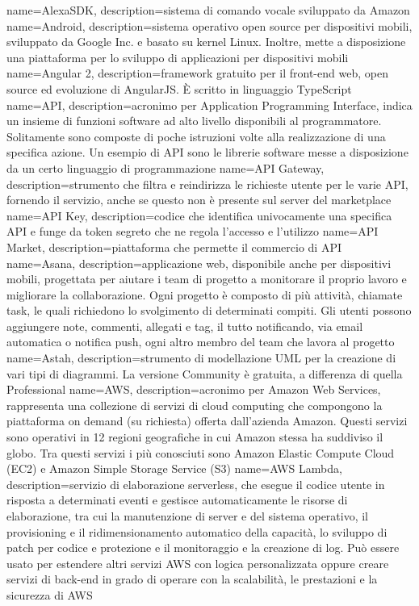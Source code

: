 \hypertarget{A}{}

{
	name=AlexaSDK,
	description={sistema di comando vocale sviluppato da Amazon}
}
{
	name=Android,
	description={sistema operativo open source per dispositivi mobili, sviluppato da Google Inc. e basato su kernel Linux. Inoltre, mette a disposizione una piattaforma per lo sviluppo di applicazioni per dispositivi mobili}
}
{
	name=Angular 2,
	description={framework gratuito per il front-end web, open source ed evoluzione di AngularJS. \MakeUppercase{è} scritto in linguaggio TypeScript}
}
{
	name=API,
	description={acronimo per Application Programming Interface, indica un insieme di funzioni software ad alto livello disponibili al programmatore. Solitamente sono composte di poche istruzioni volte alla realizzazione di una specifica azione. Un esempio di API sono le librerie software messe a disposizione da un certo linguaggio di programmazione}
}
{
	name=API Gateway,
	description={strumento che filtra e reindirizza le richieste utente per le varie API, fornendo il servizio, anche se questo non è presente sul server del marketplace}
}
{
	name=API Key,
	description={codice che identifica univocamente una specifica API e funge da token segreto che ne regola l'accesso e l'utilizzo}
}
{
	name=API Market,
	description={piattaforma che permette il commercio di API}
}
{
	name=Asana,
	description={applicazione web, disponibile anche per dispositivi mobili, progettata per aiutare i team di progetto a monitorare il proprio lavoro e migliorare la collaborazione. Ogni progetto è composto di più attività, chiamate task, le quali richiedono lo svolgimento di determinati compiti. Gli utenti possono aggiungere note, commenti, allegati e tag, il tutto notificando, via email automatica o notifica push, ogni altro membro del team che lavora al progetto}
}
{
	name=Astah,
	description={strumento di modellazione UML per la creazione di vari tipi di diagrammi. La versione Community è gratuita, a differenza di quella Professional}
}
{
	name=AWS,
	description={acronimo per Amazon Web Services, rappresenta una collezione di servizi di cloud computing che compongono la piattaforma on demand (su richiesta) offerta dall'azienda Amazon. Questi servizi sono operativi in 12 regioni geografiche in cui Amazon stessa ha suddiviso il globo. Tra questi servizi i più conosciuti sono Amazon Elastic Compute Cloud (EC2) e Amazon Simple Storage Service (S3)}
}
{
	name=AWS Lambda,
	description={servizio di elaborazione serverless, che esegue il codice utente in risposta a determinati eventi e gestisce automaticamente le risorse di elaborazione, tra cui la manutenzione di server e del sistema operativo, il provisioning e il ridimensionamento automatico della capacità, lo sviluppo di patch per codice e protezione e il monitoraggio e la creazione di log. Può essere usato per estendere altri servizi AWS con logica personalizzata oppure creare servizi di back-end in grado di operare con la scalabilità, le prestazioni e la sicurezza di AWS}
}

